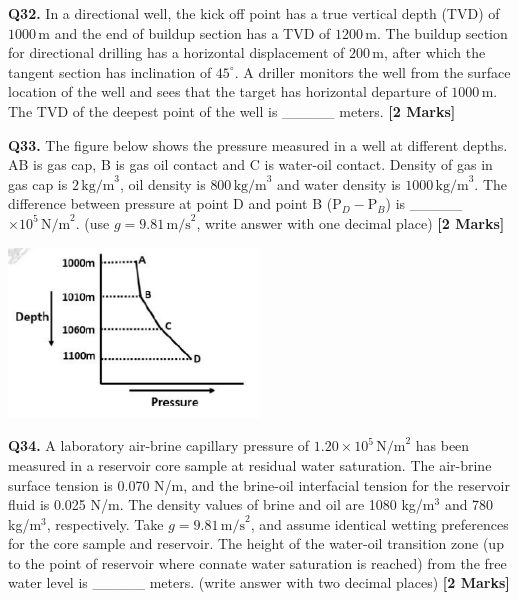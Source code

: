 \documentclass[11pt]{article}
\newcommand{\questionb}[2]{
    \noindent\textbf{Q#2.} #1 \hfill \textbf{[2 Marks]}
}
\begin{document}
\questionb{In a directional well, the kick off point has a true vertical depth (TVD) of \(1000 \, \text{m}\) and the end of buildup section has a TVD of \(1200 \, \text{m}\). The buildup section for directional drilling has a horizontal displacement of \(200 \, \text{m}\), after which the tangent section has inclination of \(45^\circ\). A driller monitors the well from the surface location of the well and sees that the target has horizontal departure of \(1000 \, \text{m}\). The TVD of the deepest point of the well is \_\_\_\_\_ meters.}{32}
\vspace{0.5cm}

\questionb{The figure below shows the pressure measured in a well at different depths. AB is gas cap, B is gas oil contact and C is water-oil contact. Density of gas in gas cap is \(2 \, \text{kg/m}^3\), oil density is \(800 \, \text{kg/m}^3\) and water density is \(1000 \, \text{kg/m}^3\). The difference between pressure at point D and point B (\(\text{P}_D - \text{P}_B\)) is \_\_\_\_\_ \(\times 10^5 \, \text{N/m}^2\). (use \(g = 9.81 \, \text{m/s}^2\), write answer with one decimal place)}{33}
\begin{center}
\includegraphics[width=0.5\textwidth]{figures/33.png}
\end{center}
\vspace{0.5cm}

\questionb{A laboratory air-brine capillary pressure of \(1.20 \times 10^5 \, \text{N/m}^2\) has been measured in a reservoir core sample at residual water saturation. The air-brine surface tension is 0.070 N/m, and the brine-oil interfacial tension for the reservoir fluid is 0.025 N/m. The density values of brine and oil are 1080 kg/m\(^3\) and 780 kg/m\(^3\), respectively. Take \(g = 9.81 \, \text{m/s}^2\), and assume identical wetting preferences for the core sample and reservoir. The height of the water-oil transition zone (up to the point of reservoir where connate water saturation is reached) from the free water level is \_\_\_\_\_ meters. (write answer with two decimal places)}{34}
\vspace{0.5cm}
\end{document}
